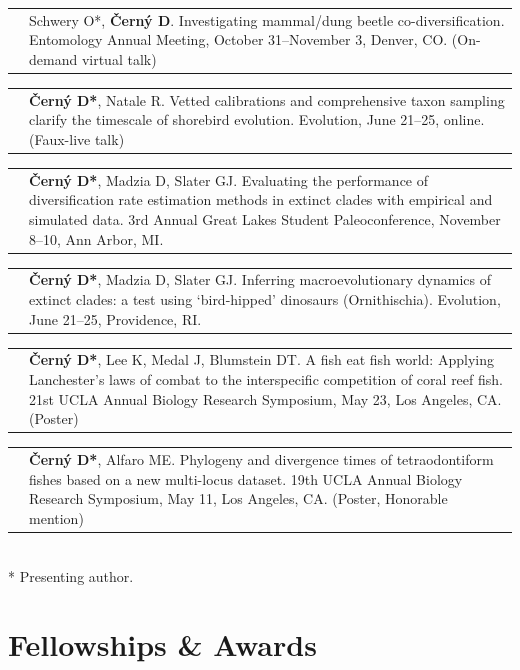 \documentclass[10pt]{article}
\begin{document}
\begin{tabularx}{\textwidth}{>{\raggedleft\arraybackslash}p{2.2cm} X}
2021 & Schwery O*, \textbf{\v{C}ern\'{y} D}. Investigating mammal/dung beetle co-diversification. Entomology Annual Meeting, October 31--November 3, Denver, CO. (On-demand virtual talk)
\end{tabularx}
\begin{tabularx}{\textwidth}{>{\raggedleft\arraybackslash}p{2.2cm} X}
2021 & \textbf{\v{C}ern\'{y} D*}, Natale R. Vetted calibrations and comprehensive taxon sampling clarify the timescale of shorebird evolution. Evolution, June 21--25, online. (Faux-live talk)
\end{tabularx}
\begin{tabularx}{\textwidth}{>{\raggedleft\arraybackslash}p{2.2cm} X}
2019 & \textbf{\v{C}ern\'{y} D*}, Madzia D, Slater GJ. Evaluating the performance of diversification rate estimation methods in extinct clades with empirical and simulated data. 3rd Annual Great Lakes Student Paleoconference, November 8--10, Ann Arbor, MI.
\end{tabularx}
\begin{tabularx}{\textwidth}{>{\raggedleft\arraybackslash}p{2.2cm} X}
2019 & \textbf{\v{C}ern\'{y} D*}, Madzia D, Slater GJ. Inferring macroevolutionary dynamics of extinct clades: a test using `bird-hipped' dinosaurs (Ornithischia). Evolution, June 21--25, Providence, RI.
\end{tabularx}
\begin{tabularx}{\textwidth}{>{\raggedleft\arraybackslash}p{2.2cm} X}
2018 & \textbf{\v{C}ern\'{y} D*}, Lee K, Medal J, Blumstein DT. A fish eat fish world: Applying Lanchester's laws of combat to the interspecific competition of coral reef fish. 21st UCLA Annual Biology Research Symposium, May 23, Los Angeles, CA. (Poster)
\end{tabularx}
\begin{tabularx}{\textwidth}{>{\raggedleft\arraybackslash}p{2.2cm} X}
2016 & \textbf{\v{C}ern\'{y} D*}, Alfaro ME. Phylogeny and divergence times of tetraodontiform fishes based on a new multi-locus dataset. 19th UCLA Annual Biology Research Symposium, May 11, Los Angeles, CA. (Poster, Honorable mention)
\end{tabularx} \\[1ex]

\hspace*{1.07cm} * Presenting author.

\section*{Fellowships \& Awards}
\end{document}
